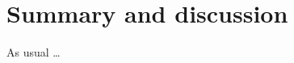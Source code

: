 \documentclass[article]{jss}
\begin{document}
%











































\section{Summary and discussion} \label{sec:summary}

\begin{leftbar}
As usual \dots
\end{leftbar}
\end{document}
